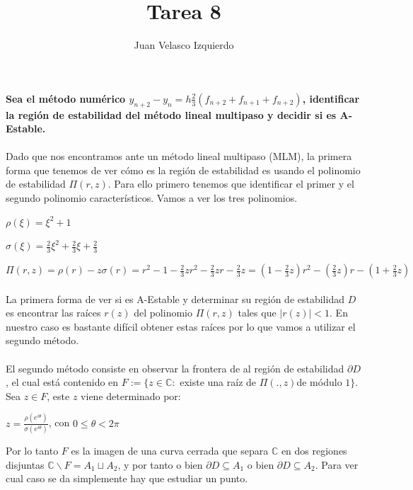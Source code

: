 \documentclass[a4paper,11pt,spanish,leqno]{article}
\title{Tarea 8}
\author{Juan Velasco Izquierdo}
\begin{document}
\maketitle
\paragraph{}\textbf{Sea el método numérico $y_{n+2}-y_{n} = h\frac{2}{3} (f_{n+2} + f_{n+1} + f_{n+2})$, identificar la región de estabilidad del método lineal multipaso y decidir si es A-Estable.}

\paragraph{}Dado que nos encontramos ante un método lineal multipaso (MLM), la primera forma que tenemos de ver cómo es la región de estabilidad es usando el polinomio de estabilidad $\Pi(r,z)$. Para ello primero tenemos que identificar el primer y el segundo polinomio característicos. Vamos a ver los tres polinomios.

$\rho(\xi)=\xi^2 + 1$

$\sigma(\xi)=\frac{2}{3}\xi^2 + \frac{2}{3}\xi + \frac{2}{3}$

$\Pi(r,z)=\rho(r) - z\sigma(r) = r^2 - 1 - \frac{2}{3}zr^2 - \frac{2}{3}zr - \frac{2}{3}z = (1-\frac{2}{3}z)r^2 - (\frac{2}{3}z)r - (1+\frac{2}{3}z)$

\paragraph{}La primera forma de ver si es A-Estable y determinar su región de estabilidad $D$ es encontrar las raíces $r(z)$ del polinomio $\Pi(r,z)$ tales que $|r(z)|<1$. En nuestro caso es bastante difícil obtener estas raíces por lo que vamos a utilizar el segundo método.

\paragraph{}El segundo método consiste en observar la frontera de al región de estabilidad $\partial D$, el cual está contenido en $F:=\{z \in \mathbb{C}:$ existe una raíz de $\Pi(.,z)$de módulo $1\}$. Sea $z\in F$, este $z$ viene determinado por:

$z = \frac{\rho(e^{i\theta})}{\sigma(e^{i\theta})}$, con $0\leq \theta < 2\pi$

Por lo tanto $F$ es la imagen de una curva cerrada que separa $\mathbb{C}$ en dos regiones disjuntas
$\mathbb{C} \backslash F = A_1 \sqcup A_2$, y por tanto o bien $\partial D \subseteq A_1$ o bien $\partial D \subseteq A_2$. Para ver cual caso se da simplemente hay que estudiar un punto.
\end{document}
